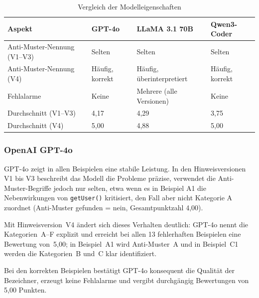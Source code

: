 \documentclass[a4paper,12pt]{article}
\begin{document}
\begin{table}[h]
    \centering
    \caption{Vergleich der Modelleigenschaften}

    \label{tab:modelleigenschaften}

    \begin{tabular}{|p{4.3cm}|p{2.8cm}|p{3cm}|p{2.8cm}|}
        \hline
        Aspekt                       & GPT-4o          & LLaMA 3.1 70B             & Qwen3-Coder     \\
        \hline
        Anti-Muster-Nennung (V1--V3) & Selten          & Selten                    & Selten          \\[0.2em]
        \hline
        Anti-Muster-Nennung (V4)     & Häufig, korrekt & Häufig, überinterpretiert & Häufig, korrekt \\[0.2em]
        \hline
        Fehlalarme                   & Keine           & Mehrere (alle Versionen)  & Keine           \\[0.2em]
        \hline
        Durchschnitt (V1--V3)        & 4{,}17          & 4{,}29                    & 3{,}75          \\[0.2em]
        \hline
        Durchschnitt (V4)            & 5{,}00          & 4{,}88                    & 5{,}00          \\
        \hline
    \end{tabular}
\end{table}

\subsubsection{OpenAI GPT-4o}

GPT-4o zeigt in allen Beispielen eine stabile Leistung. In den Hinweisversionen V1 bis V3 beschreibt das Modell die Probleme präzise, verwendet die Anti-Muster-Begriffe jedoch nur selten, etwa wenn es in Beispiel A1 die Nebenwirkungen von \texttt{getUser()} kritisiert, den Fall aber nicht Kategorie A zuordnet (Anti-Muster gefunden = nein, Gesamtpunktzahl 4{,}00).

Mit Hinweisversion~V4 ändert sich dieses Verhalten deutlich: GPT-4o nennt die Kategorien~A--F explizit und erreicht bei allen 13 fehlerhaften Beispielen eine Bewertung von~5{,}00; in Beispiel~A1 wird Anti-Muster~A und in Beispiel~C1 werden die Kategorien~B und~C klar identifiziert.

Bei den korrekten Beispielen bestätigt GPT-4o konsequent die Qualität der Bezeichner, erzeugt keine Fehlalarme und vergibt durchgängig Bewertungen von 5{,}00 Punkten.
\end{document}
